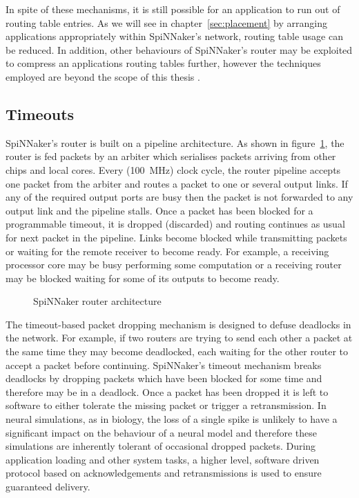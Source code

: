 			In spite of these mechanisms, it is still possible for an application to
			run out of routing table entries. As we will see in
			chapter~\ref{sec:placement} by arranging applications appropriately
			within SpiNNaker's network, routing table usage can be reduced. In
			addition, other behaviours of SpiNNaker's router may be exploited to
			compress an applications routing tables further, however the techniques
			employed are beyond the scope of this thesis \cite{mundy16}.
		
		\subsection{Timeouts}
			
			SpiNNaker's router is built on a pipeline architecture. As shown in
			figure~\ref{fig:router-architecture}, the router is fed packets by an
			arbiter which serialises packets arriving from other chips and local
			cores. Every (\SI{100}{\mega\hertz}) clock cycle, the router pipeline
			accepts one packet from the arbiter and routes a packet to one or several
			output links. If any of the required output ports are busy then the
			packet is not forwarded to any output link and the pipeline stalls. Once
			a packet has been blocked for a programmable timeout, it is dropped
			(discarded) and routing continues as usual for next packet in the
			pipeline. Links become blocked while transmitting packets or waiting for
			the remote receiver to become ready. For example, a receiving processor
			core may be busy performing some computation or a receiving router may be
			blocked waiting for some of its outputs to become ready.
			
			\begin{figure}
				\center
				
				\caption{SpiNNaker router architecture}
				\label{fig:router-architecture}
			\end{figure}
			
			The timeout-based packet dropping mechanism is designed to defuse
			deadlocks in the network. For example, if two routers are trying to send
			each other a packet at the same time they may become deadlocked, each
			waiting for the other router to accept a packet before continuing.
			SpiNNaker's timeout mechanism breaks deadlocks by dropping packets which
			have been blocked for some time and therefore may be in a deadlock.  Once
			a packet has been dropped it is left to software to either tolerate the
			missing packet or trigger a retransmission. In neural simulations, as in
			biology, the loss of a single spike is unlikely to have a significant
			impact on the behaviour of a neural model and therefore these simulations
			are inherently tolerant of occasional dropped packets. During application
			loading and other system tasks, a higher level, software driven protocol
			based on acknowledgements and retransmissions is used to ensure
			guaranteed delivery.
			

